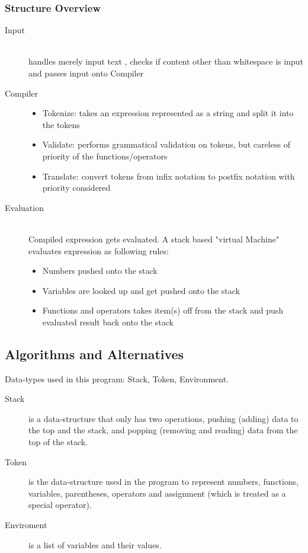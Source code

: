 \documentclass[12pt,a4paper]{article}
\begin{document}
\subsubsection{Structure Overview}
\begin{description}
  \item [Input] \hfill \\ handles merely input text , checks if content other than whitespace is input and passes input onto Compiler
  \item [Compiler] \hfill
    \begin{itemize}
      \item Tokenize: takes an expression represented as a string and split it into the tokens
      \item Validate: performs grammatical validation on tokens, but careless of priority of the functions/operators 
      \item Translate: convert tokens from infix notation to postfix notation with priority considered
      \end{itemize}    
  \item [Evaluation] \hfill \\ Compiled expression gets evaluated. A stack based "virtual Machine" evaluates expression as following rules:
\begin {itemize}
\item Numbers pushed onto the stack
\item Variables are looked up and get pushed onto the stack
\item Functions and operators takes item(s) off from the stack and push evaluated result back onto the stack
\end {itemize}
\end{description}


\iffalse
En mer detaljerad beskrivning (design)
- Vilka delar består systemet av? Hur samverkar de för att lösa problemet?

- Vilka datastrukturer används? Beskriv abstrakta datatyper (gränssnitt/interface)
\fi

\subsection{Algorithms and Alternatives}
\textnormal{ Data-types used in this program: Stack, Token, Environment.}
\begin{description}
\item [Stack] is a data-structure that only has two operations, pushing (adding) data to the top and the stack, and popping (removing and reading) data from the top of the stack.

\item[Token] is the data-structure used in the program to represent numbers, functions, variables, parentheses, operators and assignment (which is treated as a special operator).

\item[Enviroment] is a list of variables and their values.
\end{description}
\end{document}
